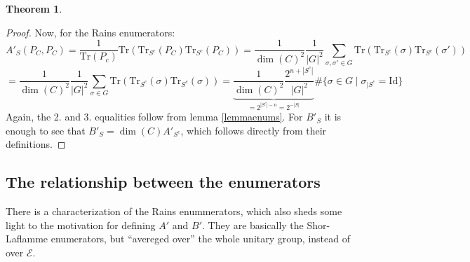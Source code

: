 \documentclass{article}
\def\E{\mathcal{E}}
\def\Tr{\text{Tr}}
\def\Id{\text{Id}}
\theoremstyle{definition}
\newtheorem{theorem}[Satz]{Theorem}
\begin{document}
\begin{theorem}
\begin{proof}
Now, for the Rains enumerators: 
\begin{equation} A'_S(P_C,P_C) = \frac{1}{\Tr(P_c)} \Tr(\Tr_{S^c}(P_C)\Tr_{S^c}(P_C)) = \frac{1}{\dim (C)^2} \frac{1}{|G|^2} \sum_{\sigma, \sigma' \in G}  \Tr(\Tr_{S^c}(\sigma)\Tr_{S^c}(\sigma')) \end{equation}
\begin{equation} = \frac{1}{\dim (C)^2} \frac{1}{|G|^2} \sum_{\sigma \in G}  \Tr(\Tr_{S^c}(\sigma)\Tr_{S^c}(\sigma)) = \underbrace{\frac{1}{\dim (C)^2} \frac{2^{n+|S^c|}}{|G|^2}}_{= 2^{|S^c| - n}=2^{-|S|}} \# \{ \sigma \in G \mid \sigma_{\big| S^c} = \Id \} \end{equation}
Again, the 2. and 3. equalities follow from lemma \ref{lemmaenums}. For $B'_S$ it is enough to see that $B'_{S} = \dim (C) A'_{S^c}$, which follows directly from their definitions.
\end{proof}

\end{theorem}

\subsection{The relationship between the enumerators}

There is a characterization of the Rains enummerators, which also sheds some light to the motivation for defining $A'$ and $B'$. 
They are basically the Shor-Laflamme enumerators, but ``avereged over'' the whole unitary group, instead of over $\E$.
\end{document}
